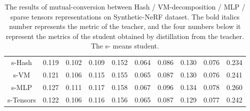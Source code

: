 \documentclass[letterpaper]{article} \usepackage{aaai23}  \usepackage{times}  \usepackage{helvet}  \usepackage{courier}  \usepackage[hyphens]{url}  \usepackage{graphicx} \urlstyle{rm} \def\UrlFont{\rm}  \usepackage{natbib}  \usepackage{caption} \frenchspacing  \setlength{\pdfpagewidth}{8.5in}  \setlength{\pdfpageheight}{11in}  \usepackage{multirow}
\begin{document}
\begin{table*}[t]
{\begin{tabular}{c|ccccccccc}
s-Hash                      & 0.119                   & 0.102                   & 0.109                   & 0.152                   & 0.064                   & 0.086                   & 0.130                   & 0.076                   & 0.234                   \\
s-VM                        & 0.121                   & 0.106                   & 0.115                   & 0.155                   & 0.065                   & 0.087                   & 0.130                   & 0.076                   & 0.241                   \\
s-MLP                       & 0.127                   & 0.111                   & 0.117                   & 0.158                   & 0.067                   & 0.096                   & 0.134                   & 0.078                   & 0.260                   \\
s-Tensors                   & 0.122                   & 0.106                   & 0.116                   & 0.156                   & 0.065                   & 0.087                   & 0.129                   & 0.077                   & 0.242                   \\ \hline
\end{tabular}
}
\caption{ The  results of mutual-conversion between Hash / VM-decomposition / MLP /
sparse tensors representations on  Synthetic-NeRF dataset. The bold italics number represents the metric of the teacher, and the four numbers below it represent the metrics of the student obtained by distillation from the teacher. The s- means
student.}
\label{tab-alex-mutual-syn}
\end{table*}
\end{document}

